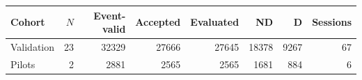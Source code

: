 \begin{tabular}{@{}lrrrrrrr@{}}
\toprule
Cohort & $N$ & Event-valid & Accepted & Evaluated & ND & D & Sessions \\
\midrule
Validation & 23 & 32329 & 27666 & 27645 & 18378 & 9267 & 67 \\
Pilots & 2 & 2881 & 2565 & 2565 & 1681 & 884 & 6 \\
\bottomrule
\end{tabular}
